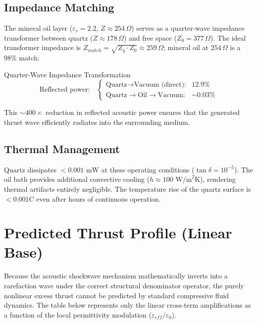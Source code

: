 \subsection{Impedance Matching}

The mineral oil layer ($\varepsilon_r = 2.2$, $Z \approx 254\,\Omega$) serves as a quarter-wave impedance transformer between quartz ($Z \approx 178\,\Omega$) and free space ($Z_0 = 377\,\Omega$). The ideal transformer impedance is $Z_{match} = \sqrt{Z_q \cdot Z_0} \approx 259\,\Omega$; mineral oil at $254\,\Omega$ is a $98\%$ match:
\begin{resultbox}{Quarter-Wave Impedance Transformation}
\begin{equation}
    \text{Reflected power:} \quad
    \begin{cases}
        \text{Quartz} \to \text{Vacuum (direct):} & 12.9\% \\
        \text{Quartz} \to \text{Oil} \to \text{Vacuum:} & \sim 0.03\%
    \end{cases}
\end{equation}
\end{resultbox}

This $\sim 400\times$ reduction in reflected acoustic power ensures that the generated thrust wave efficiently radiates into the surrounding medium.

\subsection{Thermal Management}

Quartz dissipates $< 0.001\text{ mW}$ at these operating conditions ($\tan\delta = 10^{-5}$). The oil bath provides additional convective cooling ($h \approx 100\text{ W/m}^2\text{K}$), rendering thermal artifacts entirely negligible. The temperature rise of the quartz surface is $< 0.001$\textdegree C even after hours of continuous operation.

\section{Predicted Thrust Profile (Linear Base)}

Because the acoustic shockwave mechanism mathematically inverts into a rarefaction wave under the correct structural denominator operator, the purely nonlinear excess thrust cannot be predicted by standard compressive fluid dynamics. The table below represents only the linear cross-term amplifications as a function of the local permittivity modulation ($\varepsilon_{eff}/\varepsilon_0$).

